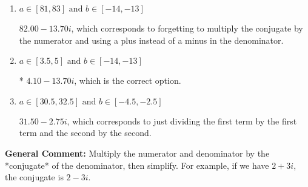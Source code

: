 \documentclass{extbook}[14pt]
\begin{document}
\begin{enumerate}
{\begin{enumerate}[label=\Alph*.]
 $8.50  + 11.50 i$, which corresponds to forgetting to multiply the conjugate by the numerator and not computing the conjugate correctly.
\item \( a \in [81, 83] \text{ and } b \in [-14, -13] \)

 $82.00  - 13.70 i$, which corresponds to forgetting to multiply the conjugate by the numerator and using a plus instead of a minus in the denominator.
\item \( a \in [3.5, 5] \text{ and } b \in [-14, -13] \)

* $4.10  - 13.70 i$, which is the correct option.
\item \( a \in [30.5, 32.5] \text{ and } b \in [-4.5, -2.5] \)

 $31.50  - 2.75 i$, which corresponds to just dividing the first term by the first term and the second by the second.
\end{enumerate}

\textbf{General Comment:} Multiply the numerator and denominator by the *conjugate* of the denominator, then simplify. For example, if we have $2+3i$, the conjugate is $2-3i$.
}
\end{enumerate}
\end{document}
